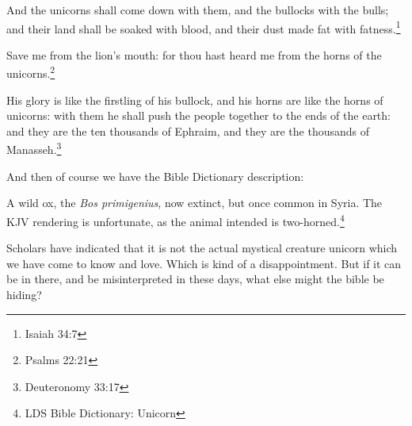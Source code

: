 \begin{displayquote}
And the unicorns shall come down with them, and the bullocks with the bulls; and 
their land shall be soaked with blood, and their dust made fat with 
fatness.\footnote{Isaiah 34:7} 
\end{displayquote}

\begin{displayquote}
Save me from the lion’s mouth: for thou hast heard me from the 
horns of the unicorns.\footnote{Psalms 22:21}
\end{displayquote}

\begin{displayquote}
His glory is like the firstling of his bullock, and his horns are like the horns 
of unicorns: with them he shall push the people together to the ends of the 
earth: and they are the ten thousands of Ephraim, and they are the thousands 
of Manasseh.\footnote{Deuteronomy 33:17} 
\end{displayquote}

And then of course we have the Bible Dictionary description:

\begin{displayquote}
A wild ox, the \textit{Bos primigenius}, now extinct, but once common in Syria. 
The KJV rendering is unfortunate, as the animal intended is two-horned.\footnote{
LDS Bible Dictionary: Unicorn
}
\end{displayquote}

Scholars have indicated that it is not the actual mystical creature unicorn which we
have come to know and love. Which is kind of a disappointment. But if it can be in
there, and be misinterpreted in these days, what else might the bible be hiding?